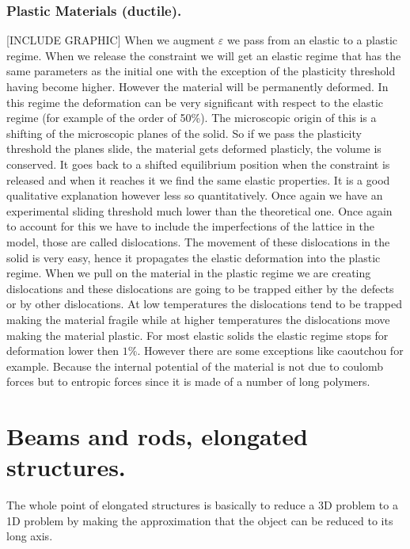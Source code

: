 \documentclass[10pt,a4paper]{book}
\begin{document}
\subsection{Plastic Materials (ductile).}
[INCLUDE GRAPHIC]
When we augment $\varepsilon$ we pass from an elastic to a plastic regime. When we release the constraint we will get an elastic regime that has the same parameters as the initial one with the exception of the plasticity threshold having become higher. However the material will be permanently deformed. In this regime the deformation can be very significant with respect to the elastic regime (for example of the order of 50\%). The microscopic origin of this is a shifting of the microscopic planes of the solid. So if we pass the plasticity threshold the planes slide, the material gets deformed plasticly, the volume is conserved. It goes back to a shifted equilibrium position when the constraint is released and when it reaches it we find the same elastic properties. It is a good qualitative explanation however less so quantitatively. Once again we have an experimental sliding threshold much lower than the theoretical one. Once again to account for this we have to include the imperfections of the lattice in the model, those are called dislocations. The movement of these dislocations in the solid is very easy, hence it propagates the elastic deformation into the plastic regime. When we pull on the material in the plastic regime we are creating dislocations and these dislocations are going to be trapped either by the defects or by other dislocations. At low temperatures the dislocations tend to be trapped making the material fragile while at higher temperatures the dislocations move making the material plastic. For most elastic solids the elastic regime stops for deformation lower then $1\%$. However there are some exceptions like caoutchou for example. Because the internal potential of the material is not due to coulomb forces but to entropic forces since it is made of a number of long polymers.

\chapter{Beams and rods, elongated structures.}
The whole point of elongated structures is basically to reduce a 3D problem to a 1D problem by making the approximation that the object can be reduced to its long axis.
\end{document}
